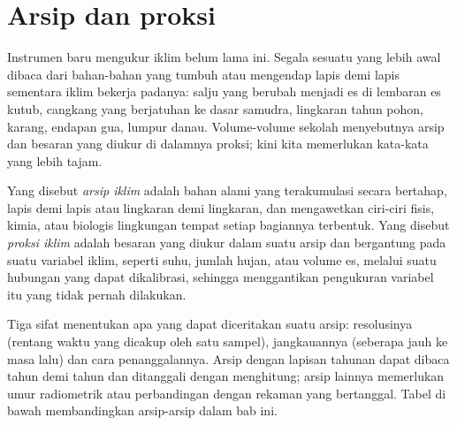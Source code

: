 \section{Arsip dan proksi}\label{sec:b2:climate-proxies:archives}

Instrumen baru mengukur iklim belum lama ini. Segala sesuatu yang lebih awal dibaca dari bahan-bahan
yang tumbuh atau mengendap lapis demi lapis sementara iklim bekerja padanya: salju yang berubah menjadi es di
lembaran es kutub, cangkang yang berjatuhan ke dasar samudra, lingkaran tahun pohon, karang, endapan
gua, lumpur danau. Volume-volume sekolah menyebutnya arsip dan besaran yang diukur di dalamnya
proksi; kini kita memerlukan kata-kata yang lebih tajam.

\begin{definition}\label{def:b2:climate-proxies:proxy}
Yang disebut \emph{arsip iklim} adalah bahan alami yang terakumulasi
secara bertahap, lapis demi lapis atau lingkaran demi lingkaran, dan mengawetkan ciri-ciri fisis, kimia, atau biologis
lingkungan tempat setiap bagiannya terbentuk. Yang disebut \emph{proksi
iklim} adalah besaran yang diukur dalam suatu arsip dan bergantung pada suatu variabel
iklim, seperti suhu, jumlah hujan, atau volume es, melalui suatu hubungan yang dapat
dikalibrasi, sehingga menggantikan pengukuran variabel itu yang tidak pernah dilakukan.
\end{definition}

Tiga sifat menentukan apa yang dapat diceritakan suatu arsip: resolusinya (rentang waktu yang dicakup oleh satu
sampel), jangkauannya (seberapa jauh ke masa lalu) dan cara penanggalannya. Arsip dengan lapisan tahunan dapat
dibaca tahun demi tahun dan ditanggali dengan menghitung; arsip lainnya memerlukan umur radiometrik atau perbandingan dengan
rekaman yang bertanggal. Tabel di bawah membandingkan arsip-arsip dalam bab ini.

